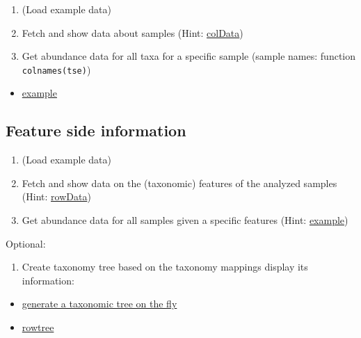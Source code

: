 \documentclass[
]{book}
\providecommand{\tightlist}{%
  \setlength{\itemsep}{0pt}\setlength{\parskip}{0pt}}
\begin{document}
\begin{enumerate}
\def\labelenumi{\arabic{enumi}.}
\tightlist
\item
  (Load example data)
\item
  Fetch and show data about samples (Hint: \href{https://microbiome.github.io/OMA/containers.html\#coldata}{colData})
\item
  Get abundance data for all taxa for a specific sample (sample names: function \texttt{colnames(tse)})
\end{enumerate}

\begin{itemize}
\tightlist
\item
  \href{https://microbiome.github.io/OMA/taxonomic-information.html\#abundances-of-all-taxa-in-specific-sample}{example}
\end{itemize}

\hypertarget{feature-side-information}{%
\subsection{Feature side information}\label{feature-side-information}}

\begin{enumerate}
\def\labelenumi{\arabic{enumi}.}
\tightlist
\item
  (Load example data)
\item
  Fetch and show data on the (taxonomic) features of the analyzed samples (Hint: \href{https://microbiome.github.io/OMA/containers.html\#rowdata}{rowData})
\item
  Get abundance data for all samples given a specific features (Hint: \href{https://microbiome.github.io/OMA/taxonomic-information.html\#abundances-of-specific-taxa-in-all-samples}{example})
\end{enumerate}

Optional:

\begin{enumerate}
\def\labelenumi{\arabic{enumi}.}
\setcounter{enumi}{3}
\tightlist
\item
  Create taxonomy tree based on the taxonomy mappings display its information:
\end{enumerate}

\begin{itemize}
\tightlist
\item
  \href{https://microbiome.github.io/OMA/taxonomic-information.html\#generate-a-taxonomic-tree-on-the-fly}{generate a taxonomic tree on the fly}
\item
  \href{https://microbiome.github.io/OMA/containers.html\#rowtree}{rowtree}
\end{itemize}
\end{document}
